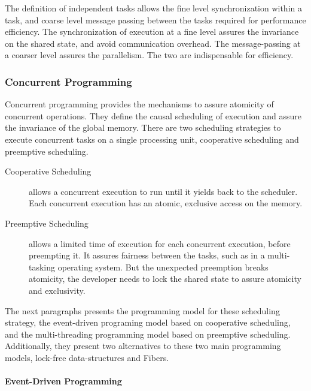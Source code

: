 The definition of independent tasks allows the fine level synchronization within a task, and coarse level message passing between the tasks required for performance efficiency.
The synchronization of execution at a fine level assures the invariance on the shared state, and avoid communication overhead.
The message-passing at a coarser level assures the parallelism.
The two are indispensable for efficiency.

\subsubsection{Concurrent Programming} \label{chapter3:software-efficiency:concurrency:concurrent-programming}


Concurrent programming provides the mechanisms to assure atomicity of concurrent operations.
They define the causal scheduling of execution and assure the invariance of the global memory.
There are two scheduling strategies to execute concurrent tasks on a single processing unit, cooperative scheduling and preemptive scheduling.

\begin{description}
\item[Cooperative Scheduling] allows a concurrent execution to run until it yields back to the scheduler.
Each concurrent execution has an atomic, exclusive access on the memory.
\item[Preemptive Scheduling] allows a limited time of execution for each concurrent execution, before preempting it.
It assures fairness between the tasks, such as in a multi-tasking operating system.
But the unexpected preemption breaks atomicity, the developer needs to lock the shared state to assure atomicity and exclusivity.
\end{description}

The next paragraphs presents the programming model for these scheduling strategy, the event-driven programing model based on cooperative scheduling, and the multi-threading programming model based on preemptive scheduling.
Additionally, they present two alternatives to these two main programming models, lock-free data-structures and Fibers.

\paragraph{Event-Driven Programming}

